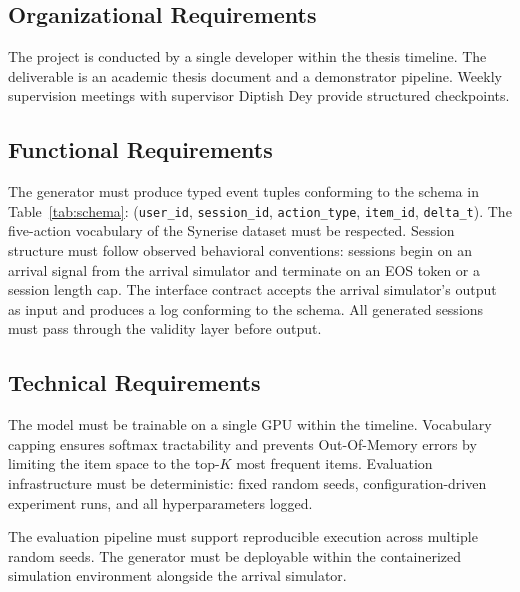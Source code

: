 \documentclass[sigconf,nonacm]{acmart}
\begin{document}
\subsection{Organizational Requirements}
The project is conducted by a single developer within the thesis timeline.
The deliverable is an academic thesis document and a demonstrator pipeline.
Weekly supervision meetings with supervisor Diptish Dey provide structured checkpoints.

\subsection{Functional Requirements}
The generator must produce typed event tuples conforming to the schema in
Table~\ref{tab:schema}: (\texttt{user\_id}, \texttt{session\_id},
\texttt{action\_type}, \texttt{item\_id}, \texttt{delta\_t}). The five-action
vocabulary of the Synerise dataset must be respected. Session structure must
follow observed behavioral conventions: sessions begin on an arrival signal
from the arrival simulator and terminate on an EOS token or a session length
cap. The interface contract accepts the arrival simulator's output as input
and produces a log conforming to the schema. All generated sessions must
pass through the validity layer before output.

\subsection{Technical Requirements}
The model must be trainable on a single GPU within the timeline. Vocabulary
capping ensures softmax tractability and prevents Out-Of-Memory errors by limiting the item space to the
top-$K$ most frequent items. Evaluation infrastructure must be deterministic:
fixed random seeds, configuration-driven experiment runs, and all
hyperparameters logged.

The evaluation pipeline must support reproducible execution across multiple
random seeds. The generator must be deployable within the containerized
simulation environment alongside the arrival simulator.

\end{document}
